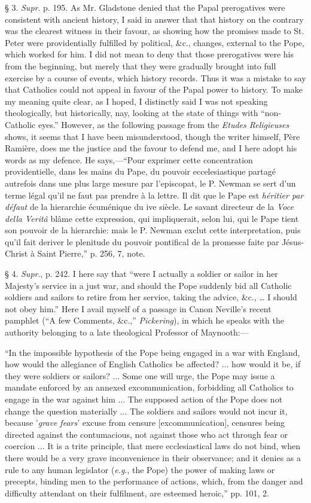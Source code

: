 § 3.
\emph{Supr}. p. 195. As Mr. Gladstone denied that the Papal prerogatives
were consistent with ancient history, I said in answer that that history
on the contrary was the clearest witness in their favour, as showing how
the promises made to St. Peter were providentially fulfilled by
political, \&c., changes, external to the Pope, which worked for him.
I did not mean to deny that those prerogatives were his from the
beginning, but merely that they were gradually brought into full
exercise by a course of events, which history records. Thus it was a
mistake to say that Catholics could not appeal in favour of the Papal
power to history. To make my meaning quite clear, as I hoped, I
distinctly said I was not speaking theologically, but historically, nay,
looking at the state of things with ``non-Catholic eyes.''
However, as the following passage from the \emph{Etudes Religieuses}
shows, it seems that I have been misunderstood, though the writer
himself, Père Ramière, does me the justice and the favour to defend
me, and I here adopt his words as my defence. He says,—``Pour
exprimer cette concentration providentielle, dans les mains du
Pape, du pouvoir eccelesiastique partagé autrefois dans une plus large
mesure par l'episcopat, le P. Newman se sert d'un terme légal qu'il ne
faut pas prendre à la lettre. Il dit que le Pape est \emph{héritier par
défaut} de la hierarchie écuménique du ive siècle. Le
savant directeur de la \emph{Voce della Veritâ} blâme cette
expression, qui impliquerait, selon lui, qui le Pape tient son pouvoir
de la hierarchie: mais le P. Newman exclut cette interpretation, puis
qu'il fait deriver le plenitude du pouvoir pontifical de la promesse
faite par Jésus-Christ à Saint Pierre,'' p. 256, 7, note.

§ 4.
\emph{Supr}., p. 242. I here say that ``were I actually a soldier or
sailor in her Majesty's service in a just war, and should the Pope
suddenly bid all Catholic soldiers and sailors to retire from her
service, taking the advice, \&c., … I should not obey him.''
Here I avail myself of a passage in Canon Neville's recent pamphlet
(``A few Comments, \&c.,'' \emph{Pickering}), in which he
speaks with the authority belonging to a late theological Professor of
Maynooth:—

``In the impossible hypothesis of the Pope being engaged in a war
with England, how would the allegiance of English Catholics be affected?
... how would it be, if they were soldiers or sailors? ... Some one will
urge, the Pope may issue a mandate enforced by an annexed
excommunication, forbidding all Catholics to engage in the war against
him ... The supposed action of the Pope does not change the question
materially ... The soldiers and sailors would not incur it, because
'\emph{grave fears}' excuse from censure [excommunication],
censures being directed against the contumacious, not against those who
act through fear or coercion ... It is a trite principle, that mere
ecclesiastical laws do not bind, when there would be a very grave
inconvenience in their observance; and it denies as a rule to any human
legislator (\emph{e.g}., the Pope) the power of making laws or precepts,
binding men to the performance of actions, which, from the danger and
difficulty attendant on their fulfilment, are esteemed heroic,'' pp.
101, 2.

